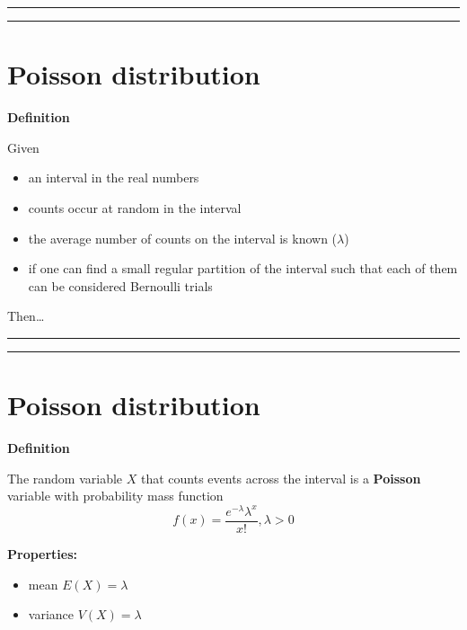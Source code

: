 \documentclass[
]{book}
\providecommand{\tightlist}{%
  \setlength{\itemsep}{0pt}\setlength{\parskip}{0pt}}
\begin{document}
\begin{center}\rule{0.5\linewidth}{0.5pt}\end{center}

\begin{center}\rule{0.5\linewidth}{0.5pt}\end{center}

\hypertarget{poisson-distribution-2}{%
\section{Poisson distribution}\label{poisson-distribution-2}}

\textbf{Definition}

Given

\begin{itemize}
\tightlist
\item
  an interval in the real numbers
\item
  counts occur at random in the interval
\item
  the average number of counts on the interval is known (\(\lambda\))
\item
  if one can find a small regular partition of the interval such that each of them can be considered Bernoulli trials
\end{itemize}

Then\ldots{}

\begin{center}\rule{0.5\linewidth}{0.5pt}\end{center}

\begin{center}\rule{0.5\linewidth}{0.5pt}\end{center}

\hypertarget{poisson-distribution-3}{%
\section{Poisson distribution}\label{poisson-distribution-3}}

\textbf{Definition}

The random variable \(X\) that counts events across the interval is a \textbf{Poisson} variable with probability mass function\\
\[f(x)= \frac{e^{-\lambda}\lambda^x}{x!}, \lambda>0\]

\textbf{Properties:}

\begin{itemize}
\tightlist
\item
  mean \(E(X)= \lambda\)
\item
  variance \(V(X)= \lambda\)
\end{itemize}
\end{document}
